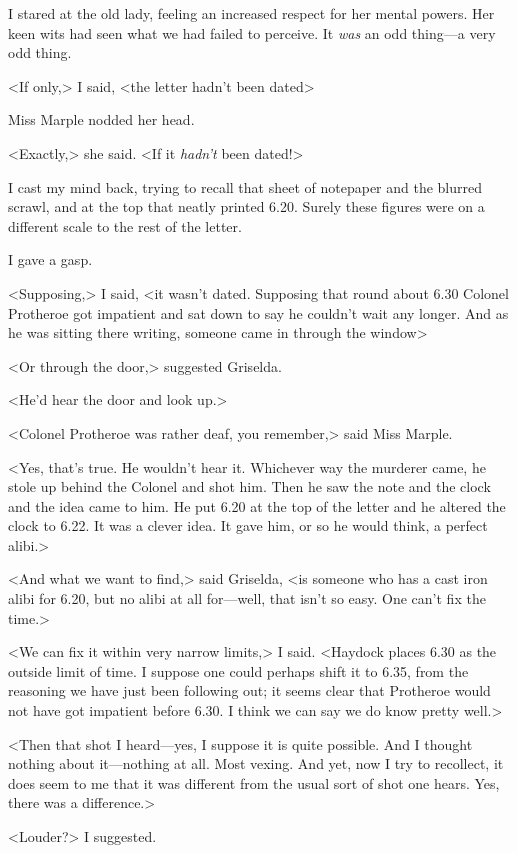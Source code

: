 I stared at the old lady, feeling an increased respect for her mental powers. Her keen wits had seen what we had failed to perceive. It \emph{was} an odd thing—a very odd thing.

<If only,> I said, <the letter hadn't been dated\longdash>

Miss Marple nodded her head.

<Exactly,> she said. <If it \emph{hadn't} been dated!>

I cast my mind back, trying to recall that sheet of notepaper and the blurred scrawl, and at the top that neatly printed 6.20. Surely these figures were on a different scale to the rest of the letter.

I gave a gasp.

<Supposing,> I said, <it wasn't dated. Supposing that round about 6.30 Colonel Protheroe got impatient and sat down to say he couldn't wait any longer. And as he was sitting there writing, someone came in through the window\longdash>

<Or through the door,> suggested Griselda.

<He'd hear the door and look up.>

<Colonel Protheroe was rather deaf, you remember,> said Miss Marple.

<Yes, that's true. He wouldn't hear it. Whichever way the murderer came, he stole up behind the Colonel and shot him. Then he saw the note and the clock and the idea came to him. He put 6.20 at the top of the letter and he altered the clock to 6.22. It was a clever idea. It gave him, or so he would think, a perfect alibi.>

<And what we want to find,> said Griselda, <is someone who has a cast iron alibi for 6.20, but no alibi at all for—well, that isn't so easy. One can't fix the time.>

<We can fix it within very narrow limits,> I said. <Haydock places 6.30 as the outside limit of time. I suppose one could perhaps shift it to 6.35, from the reasoning we have just been following out; it seems clear that Protheroe would not have got impatient before 6.30. I think we can say we do know pretty well.>

<Then that shot I heard—yes, I suppose it is quite possible. And I thought nothing about it—nothing at all. Most vexing. And yet, now I try to recollect, it does seem to me that it was different from the usual sort of shot one hears. Yes, there was a difference.>

<Louder?> I suggested.

